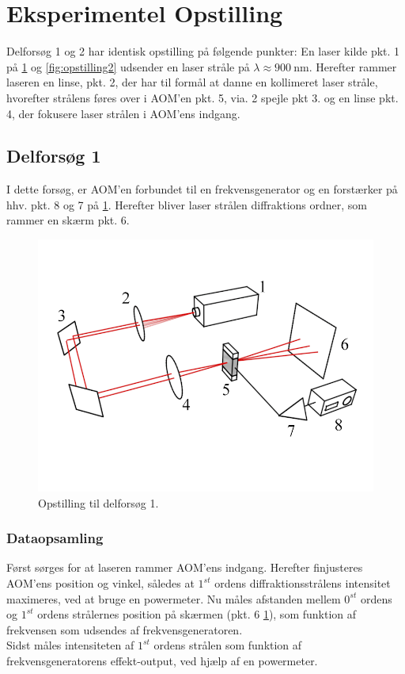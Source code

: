 \documentclass[main]{subfiles}
\begin{document}
\section{Eksperimentel Opstilling}
Delforsøg 1 og 2 har identisk opstilling på følgende punkter: En laser kilde pkt. 1 på \cref{fig:opstilling1} og \cref{fig:opstilling2} udsender en laser stråle på $\lambda \approx  \SI{900}{\nano\m} $. Herefter rammer laseren en linse, pkt. 2, der har til formål at danne en kollimeret laser stråle, hvorefter strålens føres over i AOM'en pkt. 5, via. 2 spejle pkt 3. og en linse pkt. 4, der fokusere laser strålen i AOM'ens indgang.

\subsection{Delforsøg 1}
I dette forsøg, er AOM'en forbundet til en frekvensgenerator og en forstærker på hhv. pkt. 8 og 7 på \cref{fig:opstilling1}. Herefter bliver laser strålen diffraktions ordner, som rammer en skærm pkt. 6.
\begin{figure}[H]
    \includegraphics[width=\linewidth]{tegninger/tegning1.png}
    \caption{Opstilling til delforsøg 1.}
    \label{fig:opstilling1}
\end{figure}

\subsubsection{Dataopsamling}\label{dataopsamling1}
Først sørges for at laseren rammer AOM'ens indgang. Herefter finjusteres AOM'ens position og vinkel, således at $1^{st}$ ordens diffraktionsstrålens intensitet maximeres, ved at bruge en powermeter. Nu måles afstanden mellem $0^{st}$ ordens og $1^{st}$ ordens strålernes position på skærmen (pkt. 6 \cref{fig:opstilling1}), som funktion af frekvensen som udsendes af frekvensgeneratoren.
\\ Sidst måles intensiteten af $1^{st}$ ordens strålen som funktion af frekvensgeneratorens effekt-output, ved hjælp af en powermeter.
\end{document}
